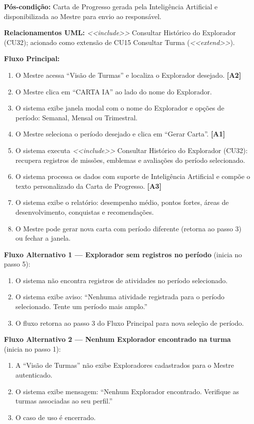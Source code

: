 \documentclass[12pt, a4paper]{article}
\begin{document}
\noindent\textbf{Pós-condição:} Carta de Progresso gerada pela Inteligência Artificial e
disponibilizada ao Mestre para envio ao responsável.

\noindent\textbf{Relacionamentos UML:} \textit{<<include>>} Consultar Histórico do Explorador
(CU32); acionado como extensão de CU15 Consultar Turma (\textit{<<extend>>}).

\medskip
\textbf{Fluxo Principal:}
\begin{enumerate}
    \item O Mestre acessa ``Visão de Turmas'' e localiza o Explorador desejado. \textbf{[A2]}
    \item O Mestre clica em ``CARTA IA'' ao lado do nome do Explorador.
    \item O sistema exibe janela modal com o nome do Explorador e opções de período: Semanal, Mensal ou Trimestral.
    \item O Mestre seleciona o período desejado e clica em ``Gerar Carta''. \textbf{[A1]}
    \item O sistema executa \textit{<<include>>} Consultar Histórico do Explorador (CU32): recupera registros de missões, emblemas e avaliações do período selecionado.
    \item O sistema processa os dados com suporte de Inteligência Artificial e compõe o texto personalizado da Carta de Progresso. \textbf{[A3]}
    \item O sistema exibe o relatório: desempenho médio, pontos fortes, áreas de desenvolvimento, conquistas e recomendações.
    \item O Mestre pode gerar nova carta com período diferente (retorna ao passo 3) ou fechar a janela.
\end{enumerate}

\textbf{Fluxo Alternativo 1 --- Explorador sem registros no período} (inicia no passo 5):
\begin{enumerate}
    \item O sistema não encontra registros de atividades no período selecionado.
    \item O sistema exibe aviso: ``Nenhuma atividade registrada para o período selecionado. Tente um período mais amplo.''
    \item O fluxo retorna ao passo 3 do Fluxo Principal para nova seleção de período.
\end{enumerate}

\textbf{Fluxo Alternativo 2 --- Nenhum Explorador encontrado na turma} (inicia no passo 1):
\begin{enumerate}
    \item A ``Visão de Turmas'' não exibe Exploradores cadastrados para o Mestre autenticado.
    \item O sistema exibe mensagem: ``Nenhum Explorador encontrado. Verifique as turmas associadas ao seu perfil.''
    \item O caso de uso é encerrado.
\end{enumerate}
\end{document}
